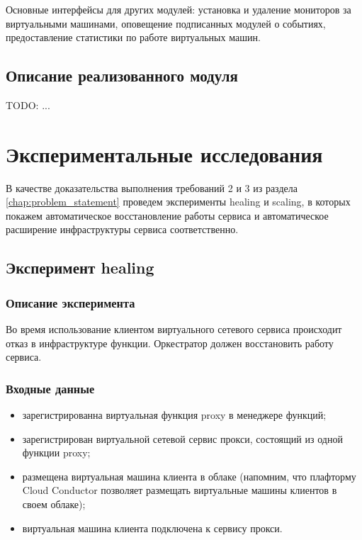 \documentclass[oneside,final,14pt,a4paper]{extreport}
\begin{document}
Основные интерфейсы для других модулей: установка и удаление мониторов за виртуальными машинами, оповещение подписанных модулей о событиях, предоставление статистики по работе виртуальных машин.


\section{Описание реализованного модуля}
TODO: ...




\chapter{Экспериментальные исследования}
\label{chap:expirements}
В качестве доказательства выполнения требований 2 и 3 из раздела \ref{chap:problem_statement} проведем эксперименты healing и scaling, в которых покажем автоматическое восстановление работы сервиса и автоматическое расширение инфраструктуры сервиса соответственно.

\section{Эксперимент healing}
\subsection{Описание эксперимента}
Во время использование клиентом виртуального сетевого сервиса происходит отказ в инфраструктуре функции. Оркестратор должен восстановить работу сервиса.

\subsection{Входные данные}
\begin{itemize}
	\item зарегистрированна виртуальная функция proxy в менеджере функций;
	\item зарегистрирован виртуальной сетевой сервис прокси, состоящий из одной функции proxy;
	\item размещена виртуальная машина клиента в облаке (напомним, что плафторму Cloud Conductor позволяет размещать виртуальные машины клиентов в своем облаке);
	\item виртуальная машина клиента подключена к сервису прокси.
\end{itemize}
\end{document}
